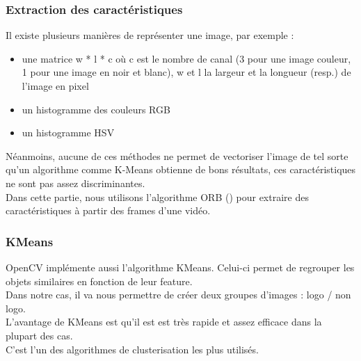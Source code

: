 \documentclass[11pt]{article}
\begin{document}
\subsubsection{Extraction des caractéristiques}
\label{sec:org39ba274}
Il existe plusieurs manières de représenter une image, par exemple :\\
\begin{itemize}
\item une matrice w * l * c où c est le nombre de canal (3 pour une image couleur, 1 pour une image en noir et blanc), w et l la largeur et la longueur (resp.) de l'image en pixel\\
\item un histogramme des couleurs RGB\\
\item un histogramme HSV\\
\end{itemize}
Néanmoins, aucune de ces méthodes ne permet de vectoriser l'image de tel sorte qu'un algorithme comme K-Means obtienne de bons résultats, ces caractéristiques ne sont pas assez discriminantes.\\

Dans cette partie, nous utilisons l'algorithme ORB (\cite{Rublee_2011}) pour extraire des caractéristiques à partir des frames d'une vidéo.\\

\subsubsection{KMeans}
\label{sec:org639d634}
OpenCV implémente aussi l'algorithme KMeans. Celui-ci permet de regrouper les objets similaires en fonction de leur feature.\\
Dans notre cas, il va nous permettre de créer deux groupes d'images : logo / non logo.\\
L'avantage de KMeans est qu'il est est très rapide et assez efficace dans la plupart des cas.\\
C'est l'un des algorithmes de clusterisation les plus utilisés.\\
\end{document}
